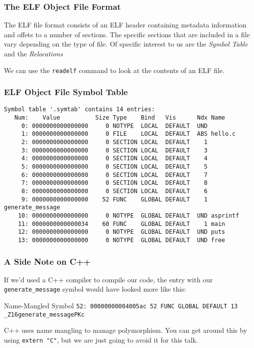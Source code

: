 \documentclass{beamer}
\begin{document}
\begin{frame}
    \frametitle{The ELF Object File Format}

    The ELF file format consists of an ELF header containing metadata
    information and offets to a number of sections.  The specific sections that
    are included in a file vary depending on the type of file.  Of specific
    interest to us are the \emph{Symbol Table} and the \emph{Relocations}

    We can use the {\tt readelf} command to look at the contents of an ELF
    file.
\end{frame}

\begin{frame}[fragile]
    \frametitle{ELF Object File Symbol Table}
    \begin{tiny}
        \begin{verbatim}
Symbol table '.symtab' contains 14 entries:
   Num:    Value          Size Type    Bind   Vis      Ndx Name
     0: 0000000000000000     0 NOTYPE  LOCAL  DEFAULT  UND
     1: 0000000000000000     0 FILE    LOCAL  DEFAULT  ABS hello.c
     2: 0000000000000000     0 SECTION LOCAL  DEFAULT    1
     3: 0000000000000000     0 SECTION LOCAL  DEFAULT    3
     4: 0000000000000000     0 SECTION LOCAL  DEFAULT    4
     5: 0000000000000000     0 SECTION LOCAL  DEFAULT    5
     6: 0000000000000000     0 SECTION LOCAL  DEFAULT    7
     7: 0000000000000000     0 SECTION LOCAL  DEFAULT    8
     8: 0000000000000000     0 SECTION LOCAL  DEFAULT    6
     9: 0000000000000000    52 FUNC    GLOBAL DEFAULT    1 generate_message
    10: 0000000000000000     0 NOTYPE  GLOBAL DEFAULT  UND asprintf
    11: 0000000000000034    60 FUNC    GLOBAL DEFAULT    1 main
    12: 0000000000000000     0 NOTYPE  GLOBAL DEFAULT  UND puts
    13: 0000000000000000     0 NOTYPE  GLOBAL DEFAULT  UND free
    \end{verbatim}
\end{tiny}
\end{frame}

\begin{frame}[fragile]
    \frametitle{A Side Note on C++}
    If we'd used a C++ compiler to compile our code, the entry with our
    {\tt generate\_message} symbol would have looked more like this:
    \begin{exampleblock}{Name-Mangled Symbol}
        {\tiny {\tt 52: 00000000004005ac    52 FUNC    GLOBAL DEFAULT   13 \_Z16generate\_messagePKc}}
    \end{exampleblock}
    C++ uses name mangling to manage polymorphism.  You can get around this by
    using {\tt extern "C"}, but we are just going to avoid it for this talk.
\end{frame}
\end{document}

